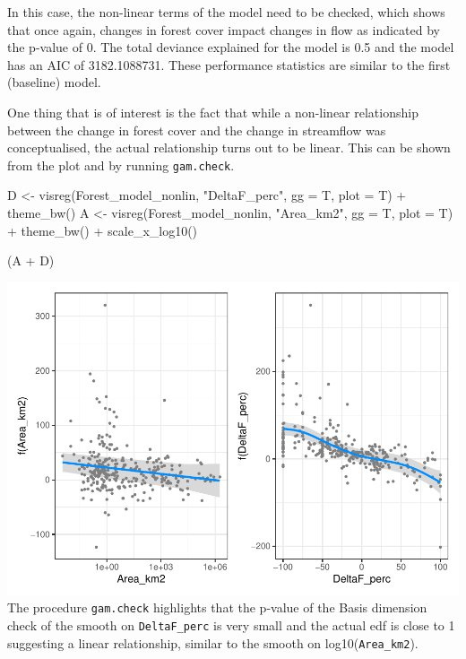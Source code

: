 \documentclass[]{elsarticle} %
\newenvironment{Shaded}{\begin{snugshade}}{\end{snugshade}}
\newcommand{\AttributeTok}[1]{\textcolor[rgb]{0.77,0.63,0.00}{#1}}
\newcommand{\FunctionTok}[1]{\textcolor[rgb]{0.00,0.00,0.00}{#1}}
\newcommand{\NormalTok}[1]{#1}
\newcommand{\OtherTok}[1]{\textcolor[rgb]{0.56,0.35,0.01}{#1}}
\newcommand{\SpecialCharTok}[1]{\textcolor[rgb]{0.00,0.00,0.00}{#1}}
\newcommand{\StringTok}[1]{\textcolor[rgb]{0.31,0.60,0.02}{#1}}
\begin{document}
In this case, the non-linear terms of the model need to be checked, which shows that once again, changes in forest cover impact changes in flow as indicated by the p-value of 0. The total deviance explained for the model is 0.5 and the model has an AIC of 3182.1088731. These performance statistics are similar to the first (baseline) model.

One thing that is of interest is the fact that while a non-linear relationship between the change in forest cover and the change in streamflow was conceptualised, the actual relationship turns out to be linear. This can be shown from the plot and by running \texttt{gam.check}.

\begin{Shaded}
\begin{Highlighting}[]
\NormalTok{D }\OtherTok{\textless{}{-}} \FunctionTok{visreg}\NormalTok{(Forest\_model\_nonlin, }\StringTok{"DeltaF\_perc"}\NormalTok{, }\AttributeTok{gg =}\NormalTok{ T, }\AttributeTok{plot =}\NormalTok{ T) }\SpecialCharTok{+} \FunctionTok{theme\_bw}\NormalTok{()}
\NormalTok{A }\OtherTok{\textless{}{-}} \FunctionTok{visreg}\NormalTok{(Forest\_model\_nonlin, }\StringTok{"Area\_km2"}\NormalTok{, }\AttributeTok{gg =}\NormalTok{ T, }\AttributeTok{plot =}\NormalTok{ T) }\SpecialCharTok{+} \FunctionTok{theme\_bw}\NormalTok{() }\SpecialCharTok{+} 
  \FunctionTok{scale\_x\_log10}\NormalTok{()}

\NormalTok{(A }\SpecialCharTok{+}\NormalTok{ D)}
\end{Highlighting}
\end{Shaded}

\includegraphics{SupplementaryMaterialPart3_files/figure-latex/unnamed-chunk-10-1.pdf}
The procedure \texttt{gam.check} highlights that the p-value of the Basis dimension check of the smooth on \texttt{DeltaF\_perc} is very small and the actual edf is close to 1 suggesting a linear relationship, similar to the smooth on log10(\texttt{Area\_km2}).
\end{document}
